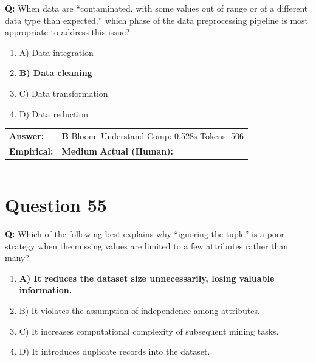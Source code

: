 \documentclass[9pt]{article}
\begin{document}
\textbf{Q:} When data are “contaminated, with some values out of range or of a different data type than expected,” which phase of the data preprocessing pipeline is most appropriate to address this issue?

\begin{enumerate}[label=\textbf{\alph{*})}, nosep]
    \item A) Data integration
    \item \textbf{B) Data cleaning} %
    \item C) Data transformation
    \item D) Data reduction

\end{enumerate}

\begin{tabular}{@{}l p{10.5cm}@{}}
\textbf{Answer:} & \textbf{B} \hspace{1em} Bloom: Understand \hspace{1em} Comp: 0.528s \hspace{1em} Tokens: 506 \\
\textbf{Empirical:} & \textbf{Medium} \hspace{1em} \textbf{Actual (Human):} \underline{\hspace{5cm}}
\end{tabular}

\vspace{0.2cm}
\rule{\textwidth}{0.4pt}
\vspace{0.2cm}


\section*{Question 55}

\textbf{Q:} Which of the following best explains why “ignoring the tuple” is a poor strategy when the missing values are limited to a few attributes rather than many?

\begin{enumerate}[label=\textbf{\alph{*})}, nosep]
    \item \textbf{A) It reduces the dataset size unnecessarily, losing valuable information.} %
    \item B) It violates the assumption of independence among attributes.
    \item C) It increases computational complexity of subsequent mining tasks.
    \item D) It introduces duplicate records into the dataset.

\end{enumerate}
\end{document}
